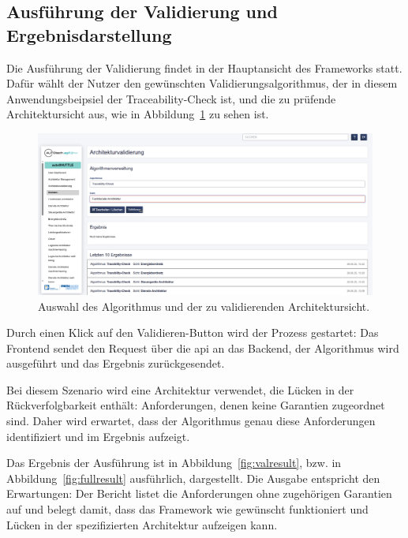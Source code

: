 \subsection{Ausführung der Validierung und Ergebnisdarstellung}

Die Ausführung der Validierung findet in der Hauptansicht des Frameworks statt. Dafür wählt der Nutzer den gewünschten Validierungsalgorithmus, der in diesem Anwendungsbeipsiel der Traceability-Check ist, und die zu prüfende Architektursicht aus, wie in Abbildung~\ref{fig:valstart} zu sehen ist.

\begin{figure}[htp!]
  \centering
  \includegraphics[width=\textwidth]{figures/06Evaluation/Bildschirmfoto vom 2025-06-30 09-16-40.png}
  \caption{Auswahl des Algorithmus und der zu validierenden Architektursicht.}
  \label{fig:valstart}
\end{figure}

Durch einen Klick auf den \glqq Validieren\grqq{}-Button wird der Prozess gestartet: Das Frontend sendet den Request über die \gls{api} an das Backend, der Algorithmus wird ausgeführt und das Ergebnis zurückgesendet.

Bei diesem Szenario wird eine Architektur verwendet, die Lücken in der Rückverfolgbarkeit enthält: Anforderungen, denen keine Garantien zugeordnet sind. Daher wird erwartet, dass der Algorithmus genau diese Anforderungen identifiziert und im Ergebnis aufzeigt.

Das Ergebnis der Ausführung ist in Abbildung~\ref{fig:valresult}, bzw. in Abbildung~\ref{fig:fullresult} ausführlich, dargestellt. Die Ausgabe entspricht den Erwartungen: Der Bericht listet die Anforderungen ohne zugehörigen Garantien auf und belegt damit, dass das Framework wie gewünscht funktioniert und Lücken in der spezifizierten Architektur aufzeigen kann.

